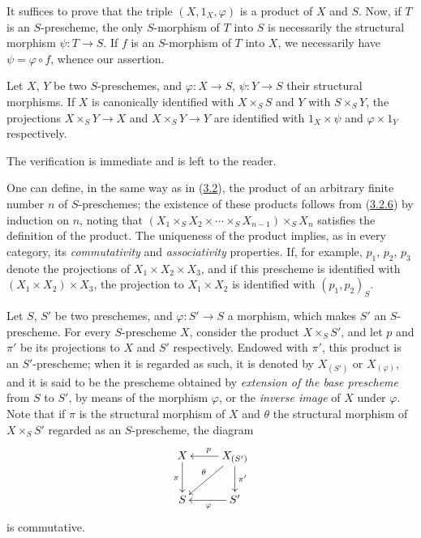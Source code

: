 It suffices to prove that the triple $(X,1_X,\varphi)$ is a product of $X$
and $S$. Now, if $T$ is an $S$-prescheme, the only $S$-morphism of $T$ into
$S$ is necessarily the structural morphism $\psi:T\to S$. If $f$ is
an $S$-morphism of $T$ into $X$, we necessarily have
$\psi=\varphi\circ f$, whence our assertion.

\begin{corollary}[3.3.4]
\label{I.3.3.4}
Let $X$, $Y$ be two $S$-preschemes, and $\varphi:X\to S$, $\psi:Y\to S$ their
structural morphisms. If $X$ is canonically identified with $X\times_S S$
and $Y$ with $S\times_S Y$, the projections $X\times_S Y\to X$ and
$X\times_S Y\to Y$ are identified with $1_X\times\psi$ and
$\varphi\times 1_Y$ respectively.
\end{corollary}

The verification is immediate and is left to the reader.

\begin{env}[3.3.5]
\label{I.3.3.5}
One can define, in the same way as in
(\hyperref[subsection:I.3.2]{3.2}), the product of an
arbitrary finite number $n$ of $S$-preschemes; the existence of these products
follows from (\hyperref[I.3.2.6]{3.2.6}) by induction on $n$, noting
that
$(X_1\times_S X_2\times\cdots\times_S X_{n-1})\times_S X_n$ satisfies
the definition of the product. The uniqueness of the product implies, as in
every category, its \emph{commutativity} and \emph{associativity} properties.
If, for example, $p_1$, $p_2$, $p_3$ denote the projections of
$X_1\times X_2\times X_3$, and if this prescheme is identified with
$(X_1\times X_2)\times X_3$, the projection to $X_1\times X_2$ is
identified with $(p_1,p_2)_S$.
\end{env}

\begin{env}[3.3.6]
\label{I.3.3.6}
Let $S$, $S'$ be two preschemes, and $\varphi:S'\to S$ a morphism, which makes
$S'$ an $S$-prescheme. For every $S$-prescheme $X$, consider the product
$X\times_S S'$, and let $p$ and $\pi'$ be its projections to $X$ and $S'$
respectively. Endowed with $\pi'$, this product is an $S'$-prescheme; when it
is regarded as such, it is denoted by $X_{(S')}$ or $X_{(\varphi)}$, and it is
said to be the prescheme obtained by \emph{extension of the base prescheme} from
$S$ to $S'$, by means of the morphism $\varphi$, or the \emph{inverse image} of
$X$ under $\varphi$. Note that if $\pi$ is the structural morphism of $X$ and
$\theta$ the structural morphism of $X\times_S S'$ regarded as an
$S$-prescheme, the diagram
\label{I.3.3.6.base-change-diagram}
\[
  \xymatrix{
    X\ar[d]_{\pi} &
    X_{(S')}\ar[l]_{p}\ar[ld]_{\theta}\ar[d]^{\pi'}\\
    S & S'\ar[l]^{\varphi}
  }
\]
is commutative.
\end{env}

